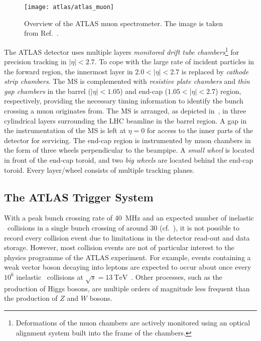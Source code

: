 \begin{figure}[htbp]
  \centering

  \texttt{[image: atlas/atlas\_muon]}

  \caption[Overview of the ATLAS muon spectrometer.]{Overview of the ATLAS muon
    spectrometer. The image is taken from Ref.~\cite{PERF-2007-01}.}%
  \label{fig:atlas_muon_system}
\end{figure}

The ATLAS detector uses multiple layers \emph{monitored drift tube
  chambers}\footnote{Deformations of the muon chambers are actively monitored
  using an optical alignment system built into the frame of the chambers.} for
precision tracking in $|\eta| < 2.7$. To cope with the large rate of incident
particles in the forward region, the innermost layer in $2.0 < |\eta| < 2.7$ is
replaced by \emph{cathode strip chambers}. The MS is complemented with
\emph{resistive plate chambers} and \emph{thin gap chambers} in the barrel
($|\eta| < 1.05$) and end-cap ($1.05 < |\eta| < 2.7$) region, respectively,
providing the necessary timing information to identify the bunch crossing a muon
originates from. The MS is arranged, as depicted
in~, in three cylindrical layers surrounding the LHC
beamline in the barrel region. A gap in the instrumentation of the MS is left at
$\eta = 0$ for access to the inner parts of the detector for servicing. The
end-cap region is instrumented by muon chambers in the form of three wheels
perpendicular to the beampipe. A \emph{small wheel} is located in front of the
end-cap toroid, and two \emph{big wheels} are located behind the end-cap
toroid. Every layer/wheel consists of multiple tracking planes.


\subsection{The ATLAS Trigger System}%
\label{sec:atlas_trigger}

With a peak bunch crossing rate of \SI{40}{\mega\hertz} and an expected number
of inelastic \pp~collisions in a single bunch crossing of around \num{30} (cf.\
), it is not possible to record every collision event due
to limitations in the detector read-out and data storage. However, most
collision events are not of particular interest to the physics programme of the
ATLAS experiment. For example, events containing a weak vector boson decaying
into leptons are expected to occur about once every $10^6$ inelastic
\pp~collisions at $\sqrt{s} = \SI{13}{\TeV}$~\cite{STDM-2015-03}. Other
processes, such as the production of Higgs bosons, are multiple orders of
magnitude less frequent than the production of $Z$ and $W$ bosons.

